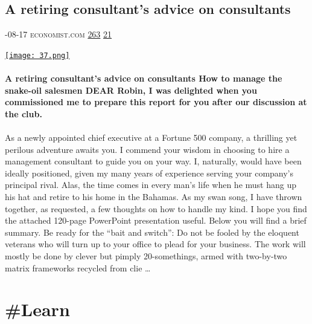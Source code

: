 \documentclass[10pt,a4paper]{article}
\begin{document}
\begin{multicols}{2}
\begin{minipage}{\linewidth}
\subsection{A retiring consultant’s advice on consultants}
\textsc{\footnotesize
{\scriptsize\faCalendar}-08-17 
{\scriptsize\faGlobe}\space 
economist.com 
{\scriptsize\faThumbsOUp}\space 
\href{http://news.ycombinator.com/item?id=37207237\&utm\_term=comment}{263} 
{\scriptsize\faComments}\space 
\href{http://news.ycombinator.com/item?id=37207237\&utm\_term=comment}{21} 
}
\par\medskip\noindent
\href{https://www.economist.com/business/2023/08/17/a-retiring-consultants-advice-on-consultants?utm\_source=hackernewsletter\&utm\_medium=email\&utm\_term=working}{
    \texttt{[image: 37.png]}
}
\end{minipage}
\paragraph{}
\textbf{A retiring consultant’s advice on consultants
How to manage the snake-oil salesmen
DEAR Robin, I was delighted when you commissioned me to prepare this report for you after our discussion at the club.}
\paragraph{}
 As a newly appointed chief executive at a Fortune 500 company, a thrilling yet perilous adventure awaits you. I commend your wisdom in choosing to hire a management consultant to guide you on your way.
I, naturally, would have been ideally positioned, given my many years of experience serving your company’s principal rival. Alas, the time comes in every man’s life when he must hang up his hat and retire to his home in the Bahamas. As my swan song, I have thrown together, as requested, a few thoughts on how to handle my kind. I hope you find the attached 120-page PowerPoint presentation useful. Below you will find a brief summary.
Be ready for the “bait and switch”: Do not be fooled by the eloquent veterans who will turn up to your office to plead for your business. The work will mostly be done by clever but pimply 20-somethings, armed with two-by-two matrix frameworks recycled from clie
\dots\par
\end{multicols}

\newpage
\section{\#Learn}
\end{document}

